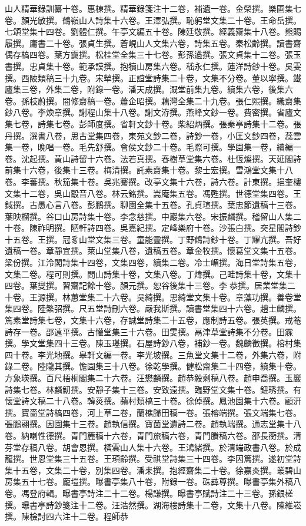 \begin{pinyinscope}
山人精華錄訓纂十卷。惠棟撰。精華錄箋注十二卷，補遺一卷。金榮撰。樂圃集七卷。顏光敏撰。鶴嶺山人詩集十六卷。王澤弘撰。恥躬堂文集二十卷。王命岳撰。七頌堂集十四卷。劉體仁撰。午亭文編五十卷。陳廷敬撰。經義齋集十八卷。熊賜履撰。庸書二十卷。張貞生撰。蒼峴山人文集六卷，詩集五卷。秦松齡撰。讀書齋偶存槁四卷。葉方靄撰。松桂堂全集三十七卷。彭孫遹撰。張文貞集十二卷。張玉書撰。忠貞集十卷。範承謨撰。抱犢山房集六卷。嵇永仁撰。蓮洋詩鈔十卷。吳雯撰。西陂類稿三十九卷。宋犖撰。正誼堂詩集二十卷，文集不分卷。董以寧撰。鐵廬集三卷，外集二卷，附錄一卷。潘天成撰。溉堂前集九卷。續集六卷，後集六卷。孫枝蔚撰。闇修齋稿一卷。蕭企昭撰。藕灣全集二十九卷。張仁熙撰。織齋集鈔八卷。李煥章撰。謝程山集十八卷。謝文洊撰。燕峰文鈔一卷。費密撰。省廬文集七卷，詩集七卷。彭師度撰。省軒文鈔十卷。柴紹炳撰。張秦亭詩集十二卷。張丹撰。潠書八卷，思古堂集四卷，東苑文鈔二卷，詩鈔一卷，小匡文鈔四卷，蕊雲集一卷，晚唱一卷。毛先舒撰。會侯文鈔二十卷。毛際可撰。學園集一卷，續編一卷。沈起撰。黃山詩留十六卷。法若真撰。春樹草堂集六卷。杜恆燦撰。天延閣詩前集十六卷，後集十三卷。梅清撰。託素齋集十卷。黎士宏撰。雪鴻堂文集十八卷。李蕃撰。秋笳集十卷。吳兆騫撰。改亭文集十六卷，詩六卷。計東撰。挹奎樓文集十二卷，吳山鷇音八卷。林云銘撰。嵩庵集五卷。馮甦撰。世德堂集四卷。王鉞撰。古愚心言八卷。彭鵬撰。聊園全集十五卷。孔貞瑄撰。葉忠節遺稿十三卷。葉映榴撰。谷口山房詩集十卷。李念慈撰。中巖集六卷。宋振麟撰。稽留山人集二十卷。陳祚明撰。陋軒詩四卷。吳嘉紀撰。定峰樂府十卷。沙張白撰。突星閣詩鈔十五卷。王撰。冠豸山堂文集三卷。童能靈撰。丁野鶴詩鈔十卷。丁耀亢撰。吾好遺稿一卷。章靜宜撰。萊山堂集八卷，遺稿五卷。章金牧撰。懷葛堂文集十五卷。梁份撰。江泠閣詩集十四卷，文集四卷，續集二卷。冷士嵋撰。海日堂詩集五卷，文集二卷。程可則撰。問山詩集十卷，文集八卷。丁煒撰。己畦詩集十卷，文集十四卷。葉燮撰。習齋記餘十卷。顏元撰。恕谷後集十三卷。李恭撰。居業堂集二十卷。王源撰。林蕙堂集二十六卷。吳綺撰。思綺堂文集十卷。章藻功撰。善卷堂集四卷。陸繁弨撰。尺五堂詩刪六卷。嚴我斯撰。讀書堂集四十六卷。趙士麟撰。篤素堂詩集七卷，文集十六卷，存誠堂詩集二十五卷，應制詩五卷。張英撰。戒菴詩存一卷。邵遠平撰。古懽堂集三十六卷。田雯撰。鬲津草堂詩集不分卷。田霡撰。學文堂集四十三卷。陳玉璂撰。石屋詩鈔八卷，補鈔一卷。魏麟徵撰。榕村集四十卷。李光地撰。皋軒文編一卷。李光坡撰。三魚堂文集十二卷，外集六卷，附錄二卷。陸隴其撰。憺園集三十八卷。徐乾學撰。健松齋集二十四卷，續集十卷。方象瑛撰。百尺梧桐閣集二十六卷。汪懋麟撰。趙恭毅剩稿八卷。趙申喬撰。玉巖詩集七卷。林麟魛撰。安靜子集十三卷。安致遠撰。臨野堂文集十卷。鈕琇撰。有懷堂詩文稿二十八卷。韓菼撰。蘋村類槁三十卷。徐倬撰。鳳池園集十六卷。顧汧撰。寶嗇堂詩槁四卷，河上草二卷，蘭樵歸田稿一卷。張榕端撰。張文端集七卷。張鵬翮撰。因園集十三卷。趙執信撰。寶菌堂遺詩二卷。趙執端撰。通志堂集十八卷。納喇性德撰。青門簏稿十六卷，青門旅稿六卷，青門賸稿六卷。邵長蘅撰。清芬堂存稿八卷。胡會恩撰。橫雲山人集十六卷。王鴻緒撰。於清端政書八卷。於成龍撰。世恩堂集三十五卷。王頊齡撰。受祺堂詩集三十四卷。李因篤撰。遂初堂詩集十五卷，文集二十卷，別集四卷。潘耒撰。抱經齋集二十卷。徐嘉炎撰。叢碧山房集五十七卷。龐塏撰。曝書亭集八十卷，附錄一卷。硃彞尊撰。曝書亭集外稿八卷。馮登府輯。曝書亭詩注二十二卷。楊謙撰。曝書亭賦詩注二十三卷。孫銀槎撰。曝書亭詩鈔箋注十二卷。汪浩然撰。湖海樓詩集十二卷，文集十八卷。陳維崧撰。陳檢討四六注十二卷。程師恭
\end{pinyinscope}
